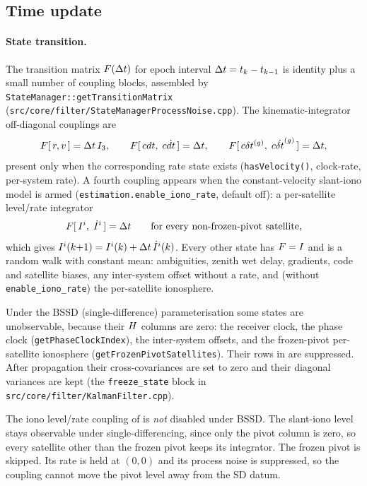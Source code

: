 \documentclass[main.tex]{subfiles}
\begin{document}
\subsection{Time update}\label{sec:kf-predict}

\paragraph{State transition.}
The transition matrix $F(\Delta t)$ for epoch interval
$\Delta t = t_k - t_{k-1}$ is identity plus a small number of coupling
blocks, assembled by \texttt{StateManager::getTransitionMatrix}
(\texttt{src/core/filter/StateManagerProcessNoise.cpp}).  The kinematic-integrator
off-diagonal couplings are
\begin{equation}
F[\,r,v\,] = \Delta t\,I_3,
\qquad
F[\,cdt,\;c\dot{dt}\,] = \Delta t,
\qquad
F[\,c\delta t^{(g)},\;c\dot{\delta t}^{(g)}\,] = \Delta t,
\label{eq:kf-F-blocks}
\end{equation}
present only when the corresponding rate state exists
(\texttt{hasVelocity()}, clock-rate, per-system rate).  A fourth coupling
appears when the constant-velocity slant-iono model is armed
(\texttt{estimation.enable\_iono\_rate}, default off): a per-satellite
level/rate integrator
\begin{equation}
F[\,I^{i},\;\dot I^{i}\,] = \Delta t
\qquad\text{for every non-frozen-pivot satellite,}
\label{eq:kf-F-iono}
\end{equation}
which gives $I^{i}(k{+}1) = I^{i}(k) + \Delta t\,\dot I^{i}(k)$.  Every
other state has $F = I$ and is a random walk with constant
mean: ambiguities, zenith wet delay, gradients, code and satellite
biases, any inter-system offset without a rate, and (without
\texttt{enable\_iono\_rate}) the per-satellite ionosphere.

Under the BSSD (single-difference) parameterisation some states are
unobservable, because their $H$ columns are zero: the receiver
clock, the phase clock (\texttt{getPhaseClockIndex}), the inter-system
offsets, and the frozen-pivot per-satellite ionosphere
(\texttt{getFrozenPivotSatellites}).  Their rows in
 are suppressed.  After propagation their
cross-covariances are set to zero and their diagonal variances are kept
(the \texttt{freeze\_state} block in
\texttt{src/core/filter/KalmanFilter.cpp}).

The iono level/rate coupling of  is \emph{not}
disabled under BSSD.  The slant-iono level stays observable under
single-differencing, since only the pivot column is zero, so every
satellite other than the frozen pivot keeps its integrator.  The frozen
pivot is skipped.  Its rate is held at $(0,0)$ and its process noise is
suppressed, so the coupling cannot move the pivot level away from the SD
datum.
\end{document}
